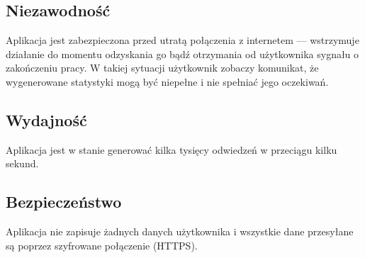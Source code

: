 \documentclass{article}
\begin{document}
\subsection{Niezawodność}
Aplikacja jest zabezpieczona przed utratą połączenia z internetem --- wstrzymuje działanie do momentu odzyskania go bądź otrzymania od użytkownika sygnału o zakończeniu pracy. W takiej sytuacji użytkownik zobaczy komunikat, że wygenerowane statystyki mogą być niepełne i nie spełniać jego oczekiwań.

\subsection{Wydajność}
Aplikacja jest w stanie generować kilka tysięcy odwiedzeń w przeciągu kilku sekund.

\subsection{Bezpieczeństwo}
Aplikacja nie zapisuje żadnych danych użytkownika i wszystkie dane przesyłane są poprzez szyfrowane połączenie (HTTPS).
\end{document}
